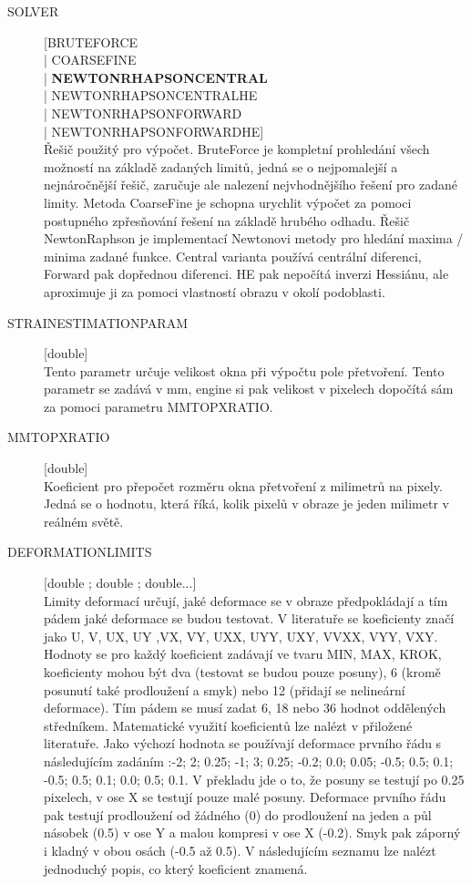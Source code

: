 \documentclass[a4paper,12pt]{article}
\begin{document}
\begin{description}
\item[SOLVER] [BRUTE\textunderscore FORCE\\| COARSE\textunderscore FINE\\| \textbf{NEWTON\textunderscore RHAPSON\textunderscore CENTRAL}\\| NEWTON\textunderscore RHAPSON\textunderscore CENTRAL\textunderscore HE\\| NEWTON\textunderscore RHAPSON\textunderscore FORWARD\\| NEWTON\textunderscore RHAPSON\textunderscore FORWARD\textunderscore HE] \\
Řešič použitý pro výpočet. BruteForce je kompletní prohledání všech možností na základě zadaných limitů, jedná se o nejpomalejší a nejnáročnější řešič, zaručuje ale nalezení nejvhodnějšího řešení pro zadané limity. Metoda CoarseFine je schopna urychlit výpočet za pomoci postupného zpřesňování řešení na základě hrubého odhadu. Řešič NewtonRaphson je implementací Newtonovi metody pro hledání maxima / minima zadané funkce. Central varianta používá centrální diferenci, Forward pak dopřednou diferenci. HE pak nepočítá inverzi Hessiánu, ale aproximuje ji za pomoci vlastností obrazu v okolí podoblasti.
\item[STRAIN\textunderscore ESTIMATION\textunderscore PARAM] [double]\\
Tento parametr určuje velikost okna při výpočtu pole přetvoření. Tento parametr se zadává v mm, engine si pak velikost v pixelech dopočítá sám za pomoci parametru MM\textunderscore TO\textunderscore PX\textunderscore RATIO.
\item[MM\textunderscore TO\textunderscore PX\textunderscore RATIO] [double]\\
Koeficient pro přepočet rozměru okna přetvoření z milimetrů na pixely. Jedná se o hodnotu, která říká, kolik pixelů v obraze je jeden milimetr v reálném světě.
\item[DEFORMATION\textunderscore LIMITS] [double ; double ; double...]\\
Limity deformací určují, jaké deformace se v obraze předpokládají a tím pádem jaké deformace se budou testovat. V literatuře se koeficienty značí jako U, V, UX, UY ,VX, VY, UXX, UYY, UXY, VVXX, VYY, VXY.  Hodnoty se pro každý koeficient zadávají ve tvaru MIN, MAX, KROK, koeficienty mohou být dva (testovat se budou pouze posuny), 6 (kromě posunutí také prodloužení a smyk) nebo 12 (přidají se nelineární deformace). Tím pádem se musí zadat 6, 18 nebo 36 hodnot oddělených středníkem. Matematické využití koeficientů lze nalézt v přiložené literatuře. Jako výchozí hodnota se používají deformace prvního řádu s následujícím zadáním :-2; 2; 0.25; -1; 3; 0.25; -0.2; 0.0; 0.05; -0.5; 0.5; 0.1; -0.5; 0.5; 0.1; 0.0; 0.5; 0.1. V překladu jde o to, že posuny se testují po 0.25 pixelech, v ose X se testují pouze malé posuny. Deformace prvního řádu pak testují prodloužení od žádného (0) do prodloužení na jeden a půl násobek (0.5) v ose Y a malou kompresi v ose X (-0.2). Smyk pak záporný i kladný v obou osách (-0.5 až 0.5). V následujícím seznamu lze nalézt jednoduchý popis, co který koeficient znamená.

\end{description}
\end{document}
